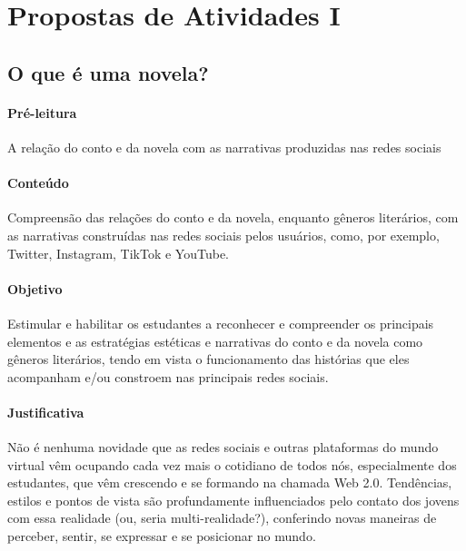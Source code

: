 \documentclass[12pt]{extarticle}
\begin{document}
\tableofcontents


\section{Propostas de Atividades I}

\subsection{O que é uma novela?}

\paragraph{Pré-leitura} A relação do conto e da novela com as narrativas produzidas nas redes sociais




\paragraph{Conteúdo} Compreensão das relações do conto e da novela,
enquanto gêneros literários, com as narrativas construídas nas redes
sociais pelos usuários, como, por exemplo, Twitter, Instagram, TikTok e
YouTube.

\paragraph{Objetivo} Estimular e habilitar os estudantes a reconhecer e
compreender os principais elementos e as estratégias estéticas e
narrativas do conto e da novela como gêneros literários, tendo em vista
o funcionamento das histórias que eles acompanham e/ou constroem nas
principais redes sociais.

\paragraph{Justificativa} Não é nenhuma novidade que as redes sociais e
outras plataformas do mundo virtual vêm ocupando cada vez mais o
cotidiano de todos nós, especialmente dos estudantes, que vêm crescendo
e se formando na chamada Web 2.0. Tendências, estilos e pontos de vista
são profundamente influenciados pelo contato dos jovens com essa
realidade (ou, seria multi-realidade?), conferindo novas maneiras de
perceber, sentir, se expressar e se posicionar no mundo.
\end{document}
